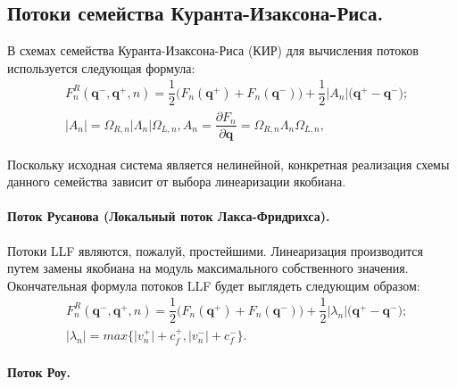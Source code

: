 \documentclass[14pt, a4paper, fleqn]{extreport}
\begin{document}
    \subsection{Потоки семейства Куранта-Изаксона-Риса.}
    
    В схемах семейства Куранта-Изаксона-Риса (КИР) 
    для вычисления потоков используется следующая формула:
    \begin{equation*}
    \begin{split}
        &F_{n}^R(\textbf{q}^{-},\textbf{q}^{+},n) 
            = \dfrac{1}{2}\Big( F_n(\textbf{q}^{+}) + F_n(\textbf{q}^{-}) \Big)
            + \dfrac{1}{2}\big|A_n\big| \Big( \textbf{q}^{+} - \textbf{q}^{-} \Big); \\
        &\big|A_n\big| = \Omega_{R,n}\big|\Lambda_{n}\big|\Omega_{L,n},
         A_n = \dfrac{\partial F_n}{\partial \textbf{q}} = \Omega_{R,n}\Lambda_{n}\Omega_{L,n},
    \end{split}
    \end{equation*}
    
    Поскольку исходная система является нелинейной, 
    конкретная реализация схемы данного семейства зависит от выбора линеаризации якобиана.
    
    \paragraph{Поток Русанова (Локальный поток Лакса-Фридрихса).}
    
    Потоки LLF являются, пожалуй, простейшими.
    Линеаризация производится путем замены якобиана на модуль максимального собственного значения.
    Окончательная формула потоков LLF будет выглядеть следующим образом:
    \begin{equation*}
    \begin{split}
        &F_{n}^R(\textbf{q}^{-},\textbf{q}^{+},n) 
            = \dfrac{1}{2}\Big( F_n(\textbf{q}^{+}) + F_n(\textbf{q}^{-}) \Big)
            + \dfrac{1}{2}\big|\lambda_n\big| \Big( \textbf{q}^{+} - \textbf{q}^{-} \Big); \\
        &\big|\lambda_n\big| = max\Big\lbrace \big|v^{+}_n\big|+c^{+}_f, \big|v^{-}_n\big|+c^{-}_f \Big\rbrace.
    \end{split}
    \end{equation*}

    \paragraph{Поток Роу.}
    
\end{document}
